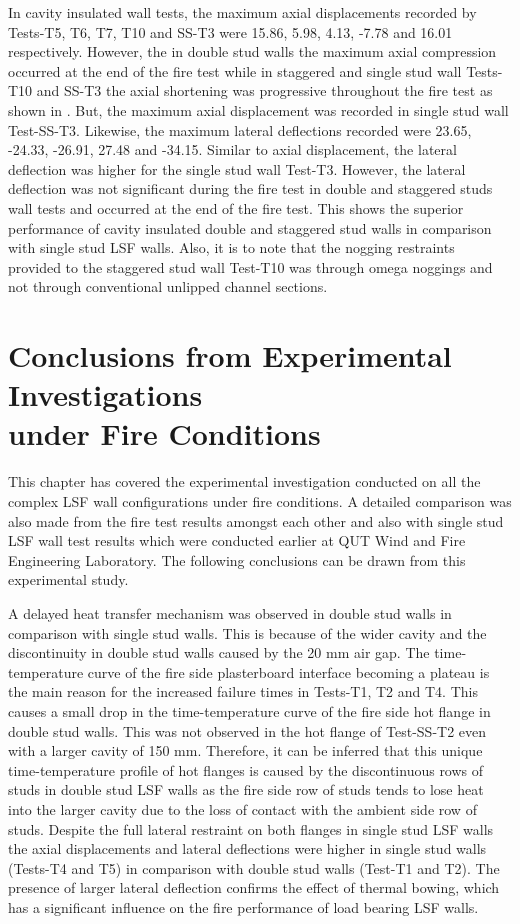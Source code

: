 In cavity insulated wall tests, the maximum axial displacements recorded by Tests-T5, T6, T7, T10 and SS-T3 were 15.86, 5.98, 4.13, -7.78 and 16.01 respectively. However, the in double stud walls the maximum axial compression occurred at the end of the fire test while in staggered and single stud wall Tests-T10 and SS-T3 the axial shortening was progressive throughout the fire test as shown in . But, the maximum axial displacement was recorded in single stud wall Test-SS-T3. Likewise, the maximum lateral deflections recorded were 23.65, -24.33, -26.91, 27.48 and -34.15. Similar to axial displacement, the lateral deflection was higher for the single stud wall Test-T3. However, the lateral deflection was not significant during the fire test in double and staggered studs wall tests and occurred at the end of the fire test. This shows the superior performance of cavity insulated double and staggered stud walls in comparison with single stud LSF walls. Also, it is to note that the nogging restraints provided to the staggered stud wall Test-T10 was through omega noggings and not through conventional unlipped channel sections.

\section{Conclusions from Experimental Investigations \\under Fire Conditions}

This chapter has covered the experimental investigation conducted on all the complex LSF wall configurations under fire conditions. A detailed comparison was also made from the fire test results amongst each other and also with single stud LSF wall test results which were conducted earlier at QUT Wind and Fire Engineering Laboratory. The following conclusions can be drawn from this experimental study.

A delayed heat transfer mechanism was observed in double stud walls in comparison with single stud walls. This is because of the wider cavity and the discontinuity in double stud walls caused by the 20 mm air gap. The time-temperature curve of the fire side plasterboard interface becoming a plateau is the main reason for the increased failure times in Tests-T1, T2 and T4. This causes a small drop in the time-temperature curve of the fire side hot flange in double stud walls. This was not observed in the hot flange of Test-SS-T2 even with a larger cavity of 150 mm. Therefore, it can be inferred that this unique time-temperature profile of hot flanges is caused by the discontinuous rows of studs in double stud LSF walls as the fire side row of studs tends to lose heat into the larger cavity due to the loss of contact with the ambient side row of studs. Despite the full lateral restraint on both flanges in single stud LSF walls the axial displacements and lateral deflections were higher in single stud walls (Tests-T4 and T5) in comparison with double stud walls (Test-T1 and T2). The presence of larger lateral deflection confirms the effect of thermal bowing, which has a significant influence on the fire performance of load bearing LSF walls.

